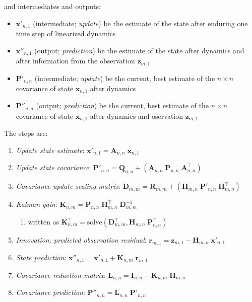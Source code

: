 \documentclass[10pt,oneside,x11names]{article}
\begin{document}
and intermediates and outputs:

\begin{itemize}
\item \(\boldsymbol{x}'_{n,1}\) (intermediate; \emph{update}) be the estimate of
the state after enduring one time step of linearized dynamics
\item \(\boldsymbol{x}''_{n,1}\) (output; \emph{prediction}) be the estimate of the
state after dynamics and after information from the observation
\(\boldsymbol{z}_{m,1}\)
\item \(\boldsymbol{P}'_{n,n}\) (intermediate; \emph{update}) be the current, best
estimate of the \(n\times{n}\) covariance of state
\(\boldsymbol{x}_{n,1}\) after dynamics
\item \(\boldsymbol{P}''_{n,n}\) (output; \emph{prediction}) be the current, best
estimate of the \(n\times{n}\) covariance of state
\(\boldsymbol{x}_{n,1}\) after dynamics and oservation
\(\boldsymbol{z}_{m,1}\)
\end{itemize}

The steps are:

\begin{enumerate}
\item \emph{Update state estimate}:
\(\boldsymbol{x}'_{n,1} = \boldsymbol{A}_{n,n}\;\boldsymbol{x}_{n,1}\)
\item \emph{Update state covariance}:
\(\boldsymbol{P}'_{n,n} = \boldsymbol{Q}_{n,n} + \left(\boldsymbol{A}_{n,n}\;\boldsymbol{P}_{n,n}\;\boldsymbol{A}_{n,n}^\intercal\right)\)
\item \emph{Covariance-update scaling matrix}:
\(\boldsymbol{D}_{m,m} = \boldsymbol{R}_{m,m} + \left(\boldsymbol{H}_{m,n}\;\boldsymbol{P}'_{n,n}\;\boldsymbol{H}_{m,n}^\intercal\right)\)
\item \emph{Kalman gain}:
\(\boldsymbol{K}_{n,m}=\boldsymbol{P}_{n,n}\;\boldsymbol{H}_{m,n}^\intercal\;\boldsymbol{D}_{m,m}^{-1}\)

\begin{enumerate}
\item written as
\(\boldsymbol{K}_{n,m}^\intercal=\text{solve}\left(\boldsymbol{D}_{m,m}^{\intercal},\boldsymbol{H}_{m,n}\;\boldsymbol{P}_{n,n}^\intercal\right)\)
\end{enumerate}

\item \emph{Innovation: predicted observation residual}:
\(\boldsymbol{r}_{m,1}=\boldsymbol{z}_{m,1} - \boldsymbol{H}_{m,n}\;\boldsymbol{x}'_{n,1}\)
\item \emph{State prediction}:
\(\boldsymbol{x}''_{n,1} = \boldsymbol{x}'_{n,1} + \boldsymbol{K}_{n,m}\;\boldsymbol{r}_{m,1}\)
\item \emph{Covariance reduction matrix}:
\(\boldsymbol{L}_{n,n}=\boldsymbol{I}_{n,n} - \boldsymbol{K}_{n,m}\;\boldsymbol{H}_{m,n}\)
\item \emph{Covariance prediction}:
\(\boldsymbol{P}''_{n,n}=\boldsymbol{L}_{n,n}\;\boldsymbol{P}'_{n,n}\)
\end{enumerate}
\end{document}
